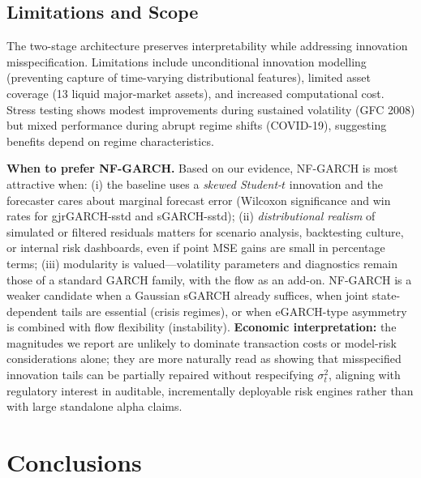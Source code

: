 \documentclass[risks,article,submit,pdftex,moreauthors]{Definitions/mdpi}
\begin{document}
\subsection{Limitations and Scope}
The two-stage architecture preserves interpretability while addressing innovation misspecification. Limitations include unconditional innovation modelling (preventing capture of time-varying distributional features), limited asset coverage (13 liquid major-market assets), and increased computational cost. Stress testing shows modest improvements during sustained volatility (GFC 2008) but mixed performance during abrupt regime shifts (COVID-19), suggesting benefits depend on regime characteristics.

\textbf{When to prefer NF-GARCH.} Based on our evidence, NF-GARCH is most attractive when: (i) the baseline uses a \emph{skewed Student-$t$} innovation and the forecaster cares about marginal forecast error (Wilcoxon significance and win rates for gjrGARCH-sstd and sGARCH-sstd); (ii) \emph{distributional realism} of simulated or filtered residuals matters for scenario analysis, backtesting culture, or internal risk dashboards, even if point MSE gains are small in percentage terms; (iii) modularity is valued---volatility parameters and diagnostics remain those of a standard GARCH family, with the flow as an add-on. NF-GARCH is a weaker candidate when a Gaussian sGARCH already suffices, when joint state-dependent tails are essential (crisis regimes), or when eGARCH-type asymmetry is combined with flow flexibility (instability). \textbf{Economic interpretation:} the magnitudes we report are unlikely to dominate transaction costs or model-risk considerations alone; they are more naturally read as showing that misspecified innovation tails can be partially repaired without respecifying $\sigma_t^2$, aligning with regulatory interest in auditable, incrementally deployable risk engines rather than with large standalone alpha claims.

\section{Conclusions}
\label{sec:conclusion}
\end{document}
